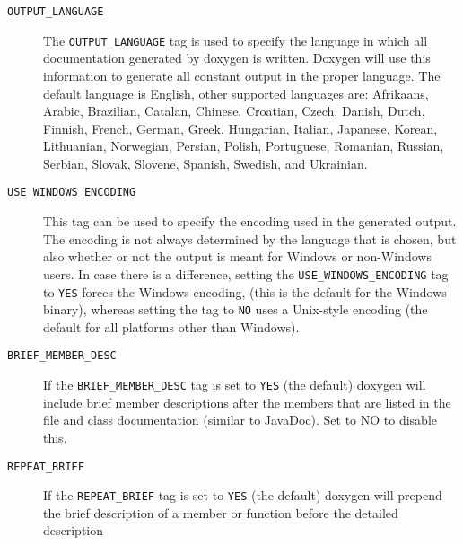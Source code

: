 \begin{description}
\label{config_cfg_output_language}
\hypertarget{config_cfg_output_language}{}
 \item[{\tt OUTPUT\_\-LANGUAGE} ] The {\tt OUTPUT\_\-LANGUAGE} tag is used to specify the language in which all documentation generated by doxygen is written. Doxygen will use this information to generate all constant output in the proper language. The default language is English, other supported languages are: Afrikaans, Arabic, Brazilian, Catalan, Chinese, Croatian, Czech, Danish, Dutch, Finnish, French, German, Greek, Hungarian, Italian, Japanese, Korean, Lithuanian, Norwegian, Persian, Polish, Portuguese, Romanian, Russian, Serbian, Slovak, Slovene, Spanish, Swedish, and Ukrainian.

\label{config_cfg_use_windows_encoding}
\hypertarget{config_cfg_use_windows_encoding}{}
 \item[{\tt USE\_\-WINDOWS\_\-ENCODING} ] This tag can be used to specify the encoding used in the generated output. The encoding is not always determined by the language that is chosen, but also whether or not the output is meant for Windows or non-Windows users. In case there is a difference, setting the {\tt USE\_\-WINDOWS\_\-ENCODING} tag to {\tt YES} forces the Windows encoding, (this is the default for the Windows binary), whereas setting the tag to {\tt NO} uses a Unix-style encoding (the default for all platforms other than Windows).

\label{config_cfg_brief_member_desc}
\hypertarget{config_cfg_brief_member_desc}{}
 \item[{\tt BRIEF\_\-MEMBER\_\-DESC} ] If the {\tt BRIEF\_\-MEMBER\_\-DESC} tag is set to {\tt YES} (the default) doxygen will include brief member descriptions after the members that are listed in the file and class documentation (similar to JavaDoc). Set to NO to disable this.

\label{config_cfg_repeat_brief}
\hypertarget{config_cfg_repeat_brief}{}
 \item[{\tt REPEAT\_\-BRIEF} ] If the {\tt REPEAT\_\-BRIEF} tag is set to {\tt YES} (the default) doxygen will prepend the brief description of a member or function before the detailed description


\end{description}
